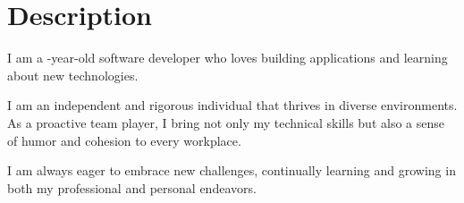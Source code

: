 
\section{Description}
\begin{mySectionContents}
\begin{FlushLeft} %

I am a \myAgeFloor-year-old software developer who loves building applications and learning about new technologies.

I am an independent and rigorous individual that thrives in diverse environments. As a proactive team player, I bring not only my technical skills but also a sense of humor and cohesion to every workplace.

I am always eager to embrace new challenges, continually learning and growing in both my professional and personal endeavors.
  

\end{FlushLeft}
\end{mySectionContents}